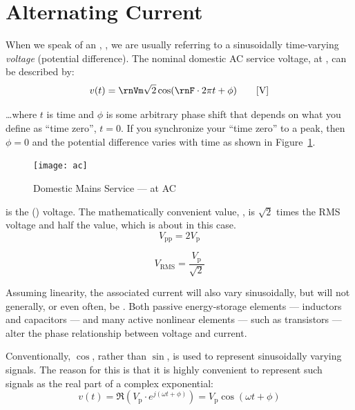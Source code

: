 \documentclass[11pt]{article}
\author{\docauthor}
\title{\doctitle}
\begin{document}
\maketitle


%


\section{Alternating Current}
\label{sec:alternating-current}

When we speak of an , , we are
usually referring to a sinusoidally time-varying \emph{voltage}
(potential difference). The nominal domestic AC service voltage, \ruVm at
\ruF, can be described by:
\[
v(t) = \rnVm\sqrt{2}\cos(\rnF\cdot 2\pi t+\phi)\qquad\bunit{V}
\]

\ldots where $t$ is time and $\phi$ is some arbitrary phase shift that
depends on what you define as ``time zero'', $t=0$. If you synchronize
your ``time zero'' to a peak, then $\phi=0$ and the potential
difference varies with time as shown in Figure~\ref{fig:ac}.

\begin{figure}[ht]
  \centering
  \texttt{[image: ac]}
  \caption{Domestic Mains Service --- \ruVm at \ruF AC}
  \label{fig:ac}
\end{figure}

\ruVm is the  () voltage. The
mathematically convenient  value, \ruVp, is $\sqrt{2}$ times the
RMS voltage and half the  value, which is about
\ruVpp in this case.
\[
V_\mathrm{pp} = 2 V_\mathrm{p}
\]

\[
V_\mathrm{RMS} = \frac{V_\mathrm{p}}{\sqrt{2}}
\]

Assuming linearity, the associated current will also vary
sinusoidally, but will not generally, or even often, be
. Both passive energy-storage elements --- inductors
and capacitors --- and many active nonlinear elements --- such as
transistors --- alter the phase relationship between voltage and
current.

Conventionally, $\cos$, rather than $\sin$, is used to represent
sinusoidally varying signals. The reason for this is that it is highly
convenient to represent such signals as the real part of a complex
exponential:
\[
v(t) = \Re(V_\mathrm{p}\cdot e^{j(\omega t+\phi)}) = V_\mathrm{p}\cos(\omega t+\phi)
\]
\end{document}
